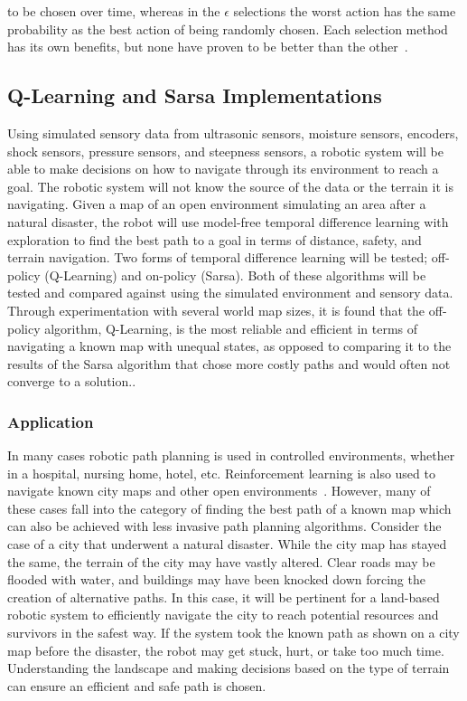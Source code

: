 \documentclass[12pt,american]{report}
\begin{document}
to be chosen over time, whereas in the \begin{math}\epsilon\end{math} selections the worst action has the same probability as the best action of being randomly chosen.  Each selection method has its own benefits, but none have proven to be better than the other~\cite{Eden}.


\subsection{Q-Learning and Sarsa Implementations}
Using simulated sensory data from ultrasonic sensors, moisture sensors, encoders, shock sensors, pressure sensors, and steepness sensors, a robotic system will be able to make decisions on how to navigate through its environment to reach a goal.  The robotic system will not know the source of the data or the terrain it is navigating.  Given a map of an open environment simulating an area after a natural disaster, the robot will use model-free temporal difference learning with exploration to find the best path to a goal in terms of distance, safety, and terrain navigation. Two forms of temporal difference learning will be tested; off-policy (Q-Learning) and on-policy (Sarsa). Both of these algorithms will be tested and compared against using the simulated environment and sensory data. Through experimentation with several world map sizes, it is found that the off-policy algorithm, Q-Learning, is the most reliable and efficient in terms of navigating a known map with unequal states, as opposed to comparing it to the results of the Sarsa algorithm that chose more costly paths and would often not converge to a solution..

\subsubsection{Application}
In many cases robotic path planning is used in controlled environments, whether in a hospital, nursing home, hotel, etc. Reinforcement learning is also used to navigate known city maps and other open environments~\cite{peng2015mobile}. However, many of these cases fall into the category of finding the best path of a known map which can also be achieved with less invasive path planning algorithms. Consider the case of a city that underwent a natural disaster.  While the city map has stayed the same, the terrain of the city may have vastly altered. Clear roads may be flooded with water, and buildings may have been knocked down forcing the creation of alternative paths. In this case, it will be pertinent for a land-based robotic system to efficiently navigate the city to reach potential resources and survivors in the safest way.  If the system took the known path as shown on a city map before the disaster, the robot may get stuck, hurt, or take too much time.  Understanding the landscape and making decisions based on the type of terrain can ensure an efficient and safe path is chosen.
\end{document}
